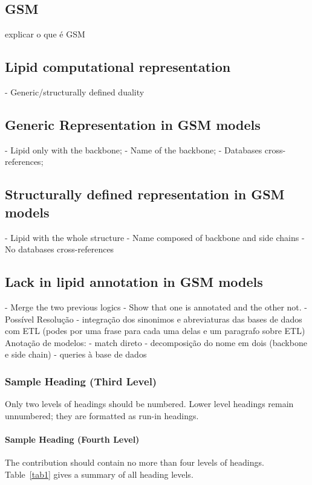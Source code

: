 \documentclass{llncs}
\begin{document}
\subsection{GSM}
explicar o que é GSM

\subsection{Lipid computational representation}

- Generic/structurally defined duality

\subsection{Generic Representation in GSM models}

- Lipid only with the backbone; 
- Name of the backbone;
- Databases cross-references;

\subsection{Structurally defined representation in GSM models}

- Lipid with the whole structure
- Name composed of backbone and side chains
- No databases cross-references

\subsection{Lack in lipid annotation in GSM models}

- Merge the two previous logics
- Show that one is annotated and the other not.
- Possível Resolução
    - integração dos sinonimos e abreviaturas das bases de dados com ETL (podes por uma frase para cada uma delas e um paragrafo sobre ETL)
    Anotação de modelos:
        - match direto
        - decomposição do nome em dois (backbone e side chain) - queries à base de dados

\subsubsection{Sample Heading (Third Level)} Only two levels of
headings should be numbered. Lower level headings remain unnumbered;
they are formatted as run-in headings.

\paragraph{Sample Heading (Fourth Level)}
The contribution should contain no more than four levels of
headings. Table~\ref{tab1} gives a summary of all heading levels.
\end{document}

